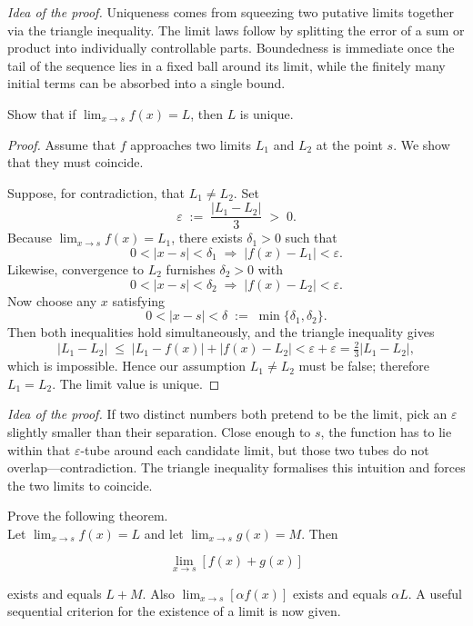 \documentclass[10pt]{extarticle}
\begin{document}
\begin{remark}
    \emph{Idea of the proof.}  Uniqueness comes from squeezing two putative limits together via the triangle inequality.  The limit laws follow by splitting the error of a sum or product into individually controllable parts.  Boundedness is immediate once the tail of the sequence lies in a fixed ball around its limit, while the finitely many initial terms can be absorbed into a single bound.
\end{remark}

\begin{exercise}[5.2]
    Show that if $\lim _{x \rightarrow s} f ( x )= L$, then $L$ is unique.
\end{exercise}

\begin{proof}
    Assume that $f$ approaches two limits $L_{1}$ and $L_{2}$ at the point $s$.  We show that they must coincide.

    Suppose, for contradiction, that $L_{1}\neq L_{2}$.  Set
    \[
        \varepsilon\;:=\;\frac{|L_{1}-L_{2}|}{3}\;>\;0.
    \]
    Because $\lim_{x\to s}f(x)=L_{1}$, there exists $\delta_{1}>0$ such that
    \[
        0<|x-s|<\delta_{1}\;\Longrightarrow\;|f(x)-L_{1}|<\varepsilon.
    \]
    Likewise, convergence to $L_{2}$ furnishes $\delta_{2}>0$ with
    \[
        0<|x-s|<\delta_{2}\;\Longrightarrow\;|f(x)-L_{2}|<\varepsilon.
    \]
    Now choose any $x$ satisfying
    \[
        0<|x-s|<\delta\;:=\;\min\{\delta_{1},\delta_{2}\}.
    \]
    Then both inequalities hold simultaneously, and the triangle inequality gives
    \[
        |L_{1}-L_{2}|\;\le\;|L_{1}-f(x)|+|f(x)-L_{2}|<\varepsilon+\varepsilon=\tfrac23|L_{1}-L_{2}|,
    \]
    which is impossible.  Hence our assumption $L_{1}\neq L_{2}$ must be false; therefore $L_{1}=L_{2}$.  The limit value is unique.
\end{proof}

\begin{remark}
    \emph{Idea of the proof.}  If two distinct numbers both pretend to be the limit, pick an $\varepsilon$ slightly smaller than their separation.  Close enough to $s$, the function has to lie within that $\varepsilon$-tube around each candidate limit, but those two tubes do not overlap—contradiction.  The triangle inequality formalises this intuition and forces the two limits to coincide.
\end{remark}

\begin{exercise}[5.3]
    Prove the following theorem.\\
    Let $\lim _{ x \rightarrow s } f ( x )= L$ and let $\lim _{ x \rightarrow s } g ( x )= M$. Then

    \begin{equation*}
        \lim _{x \rightarrow s}[f(x)+g(x)]
    \end{equation*}

    exists and equals $L + M$. Also $\lim _{ x \rightarrow s }[\alpha f ( x )]$ exists and equals $\alpha L$.
    A useful sequential criterion for the existence of a limit is now given.
\end{exercise}
\end{document}
